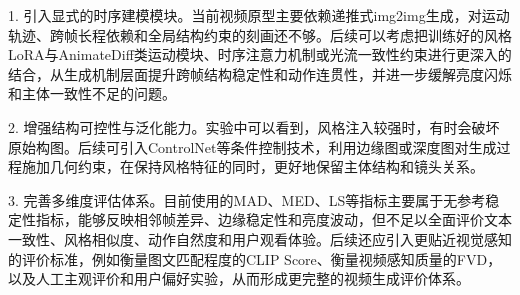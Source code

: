 1. 引入显式的时序建模模块。当前视频原型主要依赖递推式img2img生成，对运动轨迹、跨帧长程依赖和全局结构约束的刻画还不够。后续可以考虑把训练好的风格LoRA与AnimateDiff类运动模块、时序注意力机制或光流一致性约束进行更深入的结合，从生成机制层面提升跨帧结构稳定性和动作连贯性，并进一步缓解亮度闪烁和主体一致性不足的问题。

2. 增强结构可控性与泛化能力。实验中可以看到，风格注入较强时，有时会破坏原始构图。后续可引入ControlNet等条件控制技术，利用边缘图或深度图对生成过程施加几何约束，在保持风格特征的同时，更好地保留主体结构和镜头关系。

3. 完善多维度评估体系。目前使用的MAD、MED、LS等指标主要属于无参考稳定性指标，能够反映相邻帧差异、边缘稳定性和亮度波动，但不足以全面评价文本一致性、风格相似度、动作自然度和用户观看体验。后续还应引入更贴近视觉感知的评价标准，例如衡量图文匹配程度的CLIP Score、衡量视频感知质量的FVD，以及人工主观评价和用户偏好实验，从而形成更完整的视频生成评价体系。
